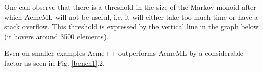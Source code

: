 One can observe that there is a threshold in the size of the Markov
monoid after which AcmeML will not be useful, i.e. it will either take
too much time or have a stack overflow. This threshold is expressed by
the vertical line in the graph below (it hovers around 3500 elements).

Even on smaller examples Acme++ outperforms AcmeML by a considerable
factor as seen in Fig. \ref{bench1}.2.
%
